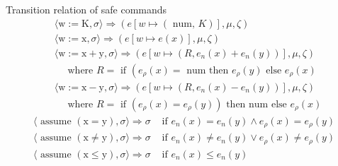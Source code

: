 \documentclass[aspectratio=169]{beamer}
\begin{document}
\begin{frame}{Transition relation of safe commands}
$$
  \begin{aligned}
& \langle\mathrm{w}:=\mathrm{K}, \sigma\rangle \Rightarrow(e[w \mapsto(\text { num, } K)], \mu, \zeta) \\
& \langle\mathrm{w}:=\mathrm{x}, \sigma\rangle \Rightarrow(e[w \mapsto e(x)], \mu, \zeta) \\
& \langle\mathrm{w}:=\mathrm{x}+\mathrm{y}, \sigma\rangle \Rightarrow\left(e\left[w \mapsto\left(R, e_n(x)+e_n(y)\right)\right], \mu, \zeta\right) \\
& \quad \text { where } R=\text { if }\left(e_\rho(x)=\text { num then } e_\rho(y) \text { else } e_\rho(x)\right. \\
& \langle\mathrm{w}:=\mathrm{x}-\mathrm{y}, \sigma\rangle \Rightarrow\left(e\left[w \mapsto\left(R, e_n(x)-e_n(y)\right)\right], \mu, \zeta\right) \\
& \quad \text { where } R=\text { if }\left(e_\rho(x)=e_\rho(y)\right) \text { then num else } e_\rho(x)
\end{aligned}
$$
$$
\begin{array}{lr}
\langle\text { assume }(\mathrm{x}=\mathrm{y}), \sigma\rangle \Rightarrow \sigma & \text { if } e_n(x)=e_n(y) \wedge e_\rho(x)=e_\rho(y) \\
\langle\text { assume }(\mathrm{x} \neq \mathrm{y}), \sigma\rangle \Rightarrow \sigma & \text { if } e_n(x) \neq e_n(y) \vee e_\rho(x) \neq e_\rho(y) \\
\langle\text { assume }(\mathrm{x} \leq \mathrm{y}), \sigma\rangle \Rightarrow \sigma & \text { if } e_n(x) \leq e_n(y)
\end{array}
$$
\end{frame}
\end{document}
